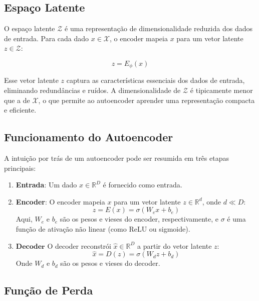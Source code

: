 \documentclass{tufte-handout}
\begin{document}
\subsection{Espaço Latente}

O espaço latente $\mathcal{Z}$ é uma representação de dimensionalidade reduzida dos dados de entrada. Para cada dado $x \in \mathcal{X}$, o encoder mapeia $x$ para um vetor 
latente $z \in \mathcal{Z}$:

\begin{equation}
    z = E_{\phi}(x)
\end{equation}

Esse vetor latente $z$ captura as características essenciais dos dados de entrada, eliminando redundâncias e ruídos.
 A dimensionalidade de $\mathcal{Z}$ é tipicamente menor que a de $\mathcal{X}$, o que permite ao autoencoder aprender uma representação compacta e eficiente.

\subsection{Funcionamento do Autoencoder}

A intuição por trás de um autoencoder pode ser resumida em três etapas principais:
\begin{enumerate}
    \item \textbf{Entrada}: Um dado $x \in \mathbb{R}^D$ é fornecido como entrada.
    \item \textbf{Encoder}: O encoder mapeia $x$ para um vetor latente $z \in \mathbb{R}^d$, onde $d \ll D$:
   \begin{equation}
       z = E(x) = \sigma(W_e x + b_e)
   \end{equation}
   Aqui, $W_e$ e $b_e$ são os pesos e vieses do encoder, respectivamente, e $\sigma$ é uma função de ativação não linear (como ReLU ou sigmoide).
   \item $\mathbf{Decoder}$ O decoder reconstrói $\hat{x} \in \mathbb{R}^D$ a partir do vetor latente $z$:
   \begin{equation}
       \hat{x} = D(z) = \sigma(W_d z + b_d)
   \end{equation}
   Onde $W_d$ e $b_d$ são os pesos e vieses do decoder.
\end{enumerate}

\subsection{Função de Perda}
\end{document}
